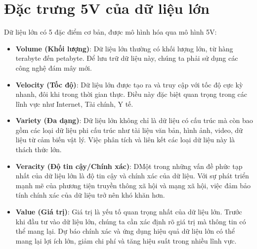 \section{Đặc trưng 5V của dữ liệu lớn}
Dữ liệu lớn có 5 đặc điểm cơ bản, được mô hình hóa qua mô hình 5V:
\begin{itemize}
    \item \textbf{Volume (Khối lượng)}: Dữ liệu lớn thường có khối lượng lớn,
          từ hàng terabyte đến petabyte. Để lưu trữ dữ liệu này, chúng ta phải
          sử dụng các công nghệ đám mây mới.
    \item \textbf{Velocity (Tốc độ)}: Dữ liệu lớn được tạo ra và truy cập với
          tốc độ cực kỳ nhanh, đôi khi trong thời gian thực. Điều này đặc biệt quan
          trọng trong các lĩnh vực như Internet, Tài chính, Y tế.
    \item \textbf{Variety (Đa dạng)}: Dữ liệu lớn không chỉ là dữ liệu có cấu trúc
          mà còn bao gồm các loại dữ liệu phi cấu trúc như tài liệu văn bản, hình ảnh,
          video, dữ liệu từ cảm biến vật lý. Việc phân tích và liên kết các loại dữ liệu
          này là thách thức lớn.
    \item \textbf{Veracity (Độ tin cậy/Chính xác)}: DMột trong những vấn đề phức tạp
          nhất của dữ liệu lớn là độ tin cậy và chính xác của dữ liệu. Với sự phát triển
          mạnh mẽ của phương tiện truyền thông xã hội và mạng xã hội, việc đảm bảo tính
          chính xác của dữ liệu trở nên khó khăn hơn.
    \item \textbf{Value (Giá trị)}: Giá trị là yếu tố quan trọng nhất của dữ liệu
          lớn. Trước khi đầu tư vào dữ liệu lớn, chúng ta cần xác định rõ giá trị mà
          thông tin có thể mang lại. Dự báo chính xác và ứng dụng hiệu quả dữ liệu lớn
          có thể mang lại lợi ích lớn, giảm chi phí và tăng hiệu suất trong nhiều lĩnh
          vực.
\end{itemize}


